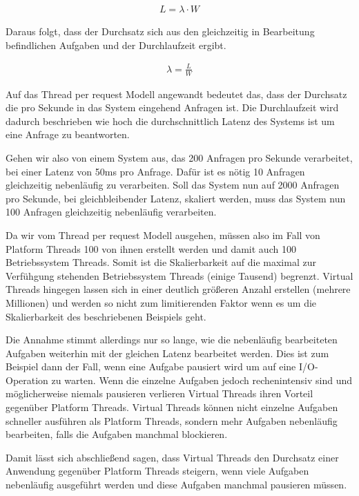 \documentclass[fontsize=12pt,paper=a4,twoside=semi,parskip=half-,headsepline,headinclude]{scrreprt}
\begin{document}
\begin{eqnarray}
	L = \lambda \cdot W \nonumber
\end{eqnarray}

Daraus folgt, dass der Durchsatz sich aus den gleichzeitig in Bearbeitung befindlichen Aufgaben und der Durchlaufzeit ergibt.

\begin{eqnarray}
	\lambda = \frac{L}{W} \nonumber
\end{eqnarray}

Auf das Thread per request Modell angewandt bedeutet das, dass der Durchsatz die pro Sekunde in das System eingehend Anfragen ist. Die Durchlaufzeit wird dadurch beschrieben wie hoch die durchschnittlich Latenz des Systems ist um eine Anfrage zu beantworten. 

Gehen wir also von einem System aus, das 200 Anfragen pro Sekunde verarbeitet, bei einer Latenz von 50ms pro Anfrage. Dafür ist es nötig 10 Anfragen gleichzeitig nebenläufig zu verarbeiten. Soll das System nun auf 2000 Anfragen pro Sekunde, bei gleichbleibender Latenz, skaliert werden, muss das System nun 100  Anfragen gleichzeitig nebenläufig verarbeiten.

Da wir vom Thread per request Modell ausgehen, müssen also im Fall von  Platform Threads 100 von ihnen erstellt werden und damit auch 100 Betriebssystem Threads. Somit ist die Skalierbarkeit auf die maximal zur Verfühgung stehenden Betriebssystem Threads (einige Tausend) begrenzt. Virtual Threads hingegen lassen sich in einer deutlich größeren Anzahl erstellen (mehrere Millionen) und werden so nicht zum limitierenden Faktor wenn es um die Skalierbarkeit des beschriebenen Beispiels geht.

Die Annahme stimmt allerdings nur so lange, wie die nebenläufig bearbeiteten Aufgaben weiterhin mit der gleichen Latenz bearbeitet werden. Dies ist zum Beispiel dann der Fall, wenn eine Aufgabe pausiert wird um auf eine I/O-Operation zu warten. Wenn die einzelne Aufgaben jedoch rechenintensiv sind und möglicherweise niemals pausieren verlieren Virtual Threads ihren Vorteil gegenüber Platform Threads. Virtual Threads können nicht einzelne Aufgaben schneller ausführen als Platform Threads, sondern mehr Aufgaben nebenläufig bearbeiten, falls die Aufgaben manchmal blockieren. 

Damit lässt sich abschließend sagen, dass Virtual Threads den Durchsatz einer Anwendung gegenüber Platform Threads steigern, wenn viele Aufgaben nebenläufig ausgeführt werden und diese Aufgaben manchmal pausieren müssen.
\end{document}
